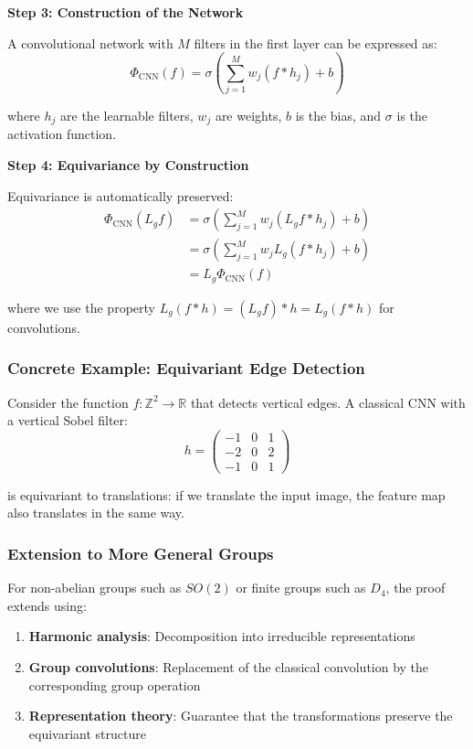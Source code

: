 \textbf{Step 3: Construction of the Network}

A convolutional network with $M$ filters in the first layer can be expressed as:
\begin{equation}
    \Phi_{\text{CNN}}(f) = \sigma\left(\sum_{j=1}^M w_j (f * h_j) + b\right)
\end{equation}

where $h_j$ are the learnable filters, $w_j$ are weights, $b$ is the bias, and $\sigma$ is the activation function.

\textbf{Step 4: Equivariance by Construction}

Equivariance is automatically preserved:
\begin{align}
    \Phi_{\text{CNN}}(L_g f) &= \sigma\left(\sum_{j=1}^M w_j (L_g f * h_j) + b\right) \\
    &= \sigma\left(\sum_{j=1}^M w_j L_g(f * h_j) + b\right) \\
    &= L_g \Phi_{\text{CNN}}(f)
\end{align}

where we use the property $L_g(f * h) = (L_g f) * h = L_g(f * h)$ for convolutions.

\subsubsection{Concrete Example: Equivariant Edge Detection}

Consider the function $f: \mathbb{Z}^2 \to \mathbb{R}$ that detects vertical edges. A classical CNN with a vertical Sobel filter:
\begin{equation}
    h = \begin{pmatrix} -1 & 0 & 1 \\ -2 & 0 & 2 \\ -1 & 0 & 1 \end{pmatrix}
\end{equation}

is equivariant to translations: if we translate the input image, the feature map also translates in the same way.

\subsubsection{Extension to More General Groups}

For non-abelian groups such as $SO(2)$ or finite groups such as $D_4$, the proof extends using:

\begin{enumerate}
    \item \textbf{Harmonic analysis}: Decomposition into irreducible representations
    \item \textbf{Group convolutions}: Replacement of the classical convolution by the corresponding group operation
    \item \textbf{Representation theory}: Guarantee that the transformations preserve the equivariant structure
\end{enumerate}

